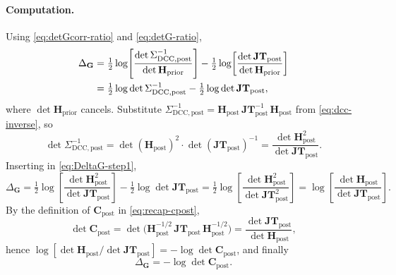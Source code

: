 \documentclass[11pt]{article}
\begin{document}
\paragraph{Computation.}
Using \eqref{eq:detGcorr-ratio} and \eqref{eq:detG-ratio},
\begin{align}
\Delta_{\mathbf G}
&=
\tfrac{1}{2}\log\!\left[ \frac{\det \Sigma_{\mathrm{DCC},\mathrm{post}}^{-1}}{\det \mathbf H_{\mathrm{prior}}}\right]
-
\tfrac{1}{2}\log\!\left[ \frac{\det \mathbf{JT}_{\mathrm{post}}}{\det \mathbf H_{\mathrm{prior}}}\right]
\notag\\
&=
\tfrac{1}{2}\log \det \Sigma_{\mathrm{DCC},\mathrm{post}}^{-1}
-
\tfrac{1}{2}\log \det \mathbf{JT}_{\mathrm{post}},
\label{eq:DeltaG-step1}
\end{align}
where $\det \mathbf H_{\mathrm{prior}}$ cancels. Substitute $\Sigma_{\mathrm{DCC},\mathrm{post}}^{-1} = \mathbf H_{\mathrm{post}}\, \mathbf{JT}_{\mathrm{post}}^{-1}\, \mathbf H_{\mathrm{post}}$ from \eqref{eq:dcc-inverse}, so
\begin{equation}
\det \Sigma_{\mathrm{DCC},\mathrm{post}}^{-1}
=
\det(\mathbf H_{\mathrm{post}})^2 \cdot \det(\mathbf{JT}_{\mathrm{post}})^{-1}
=
\frac{\det \mathbf H_{\mathrm{post}}^{2}}{\det \mathbf{JT}_{\mathrm{post}}}.
\label{eq:detDCCinv}
\end{equation}
Inserting in \eqref{eq:DeltaG-step1},
\begin{equation}
\Delta_{\mathbf G}
=
\tfrac{1}{2}\log\!\left[ \frac{\det \mathbf H_{\mathrm{post}}^{2}}{\det \mathbf{JT}_{\mathrm{post}}}\right]
-
\tfrac{1}{2}\log \det \mathbf{JT}_{\mathrm{post}}
=
\tfrac{1}{2}\log\!\left[ \frac{\det \mathbf H_{\mathrm{post}}^{2}}{\det \mathbf{JT}_{\mathrm{post}}^{2}}\right]
=
\log\!\left[ \frac{\det \mathbf H_{\mathrm{post}}}{\det \mathbf{JT}_{\mathrm{post}}}\right].
\label{eq:DeltaG-step2}
\end{equation}
By the definition of $\mathbf C_{\mathrm{post}}$ in \eqref{eq:recap-cpost},
\begin{equation}
\det \mathbf C_{\mathrm{post}}
=
\det\bigl(\mathbf H_{\mathrm{post}}^{-1/2}\, \mathbf{JT}_{\mathrm{post}}\, \mathbf H_{\mathrm{post}}^{-1/2}\bigr)
=
\frac{\det \mathbf{JT}_{\mathrm{post}}}{\det \mathbf H_{\mathrm{post}}},
\label{eq:detCpost}
\end{equation}
hence $\log[\det \mathbf H_{\mathrm{post}} / \det \mathbf{JT}_{\mathrm{post}}] = -\log \det \mathbf C_{\mathrm{post}}$, and finally
\begin{equation}
\boxed{\;
\Delta_{\mathbf G}
=
-\log \det \mathbf C_{\mathrm{post}}.
\;}
\label{eq:DeltaG-identity}
\end{equation}
\end{document}
